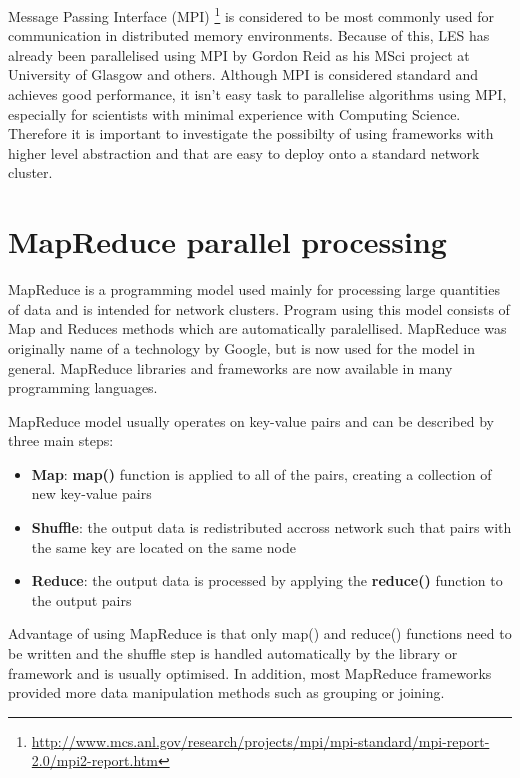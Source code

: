 \documentclass{l4proj}
\begin{document}
Message Passing Interface (MPI) \footnote{\url{http://www.mcs.anl.gov/research/projects/mpi/mpi-standard/mpi-report-2.0/mpi2-report.htm}} 
is considered to be most commonly used for communication in distributed memory environments.
Because of this, LES has already been parallelised using MPI by Gordon Reid as his MSci project at University of Glasgow\cite{les_mpi} and others\cite{les_palm}. Although MPI is considered standard and achieves good performance, it
isn't easy task to parallelise algorithms using MPI, especially for scientists with minimal
experience with Computing Science. Therefore it is important to investigate the possibilty
of using frameworks with higher level abstraction and that are easy to deploy onto a standard
network cluster.


\section{MapReduce parallel processing}

MapReduce is a programming model used mainly for processing large quantities of data
and is intended for network clusters\cite{map_reduce}. Program using this model consists of Map and Reduces
methods which are automatically paralellised. MapReduce was originally name of a technology by
Google, but is now used for the model in general. MapReduce libraries and frameworks are now 
available in many programming languages.

MapReduce model usually operates on key-value pairs and can be described by three main steps:

\begin{itemize}  
\item \textbf{Map}: \textbf{map()} function is applied to all of the pairs, creating a collection of new key-value pairs
\item \textbf{Shuffle}: the output data is redistributed accross network such that pairs with the same key are located on the same node
\item \textbf{Reduce}: the output data is processed by applying the \textbf{reduce()} function to the output pairs
\end{itemize}

Advantage of using MapReduce is that only map() and reduce() functions need to be written and
the shuffle step is handled automatically by the library or framework and is usually optimised. 
In addition, most MapReduce frameworks provided more data manipulation methods such as grouping or 
joining.
\end{document}
